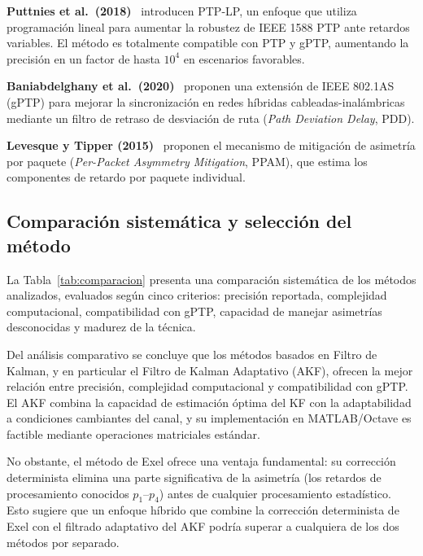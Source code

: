 \textbf{Puttnies et al.\ (2018)}~\cite{puttnies2018} introducen PTP-LP, un enfoque que utiliza programación lineal para aumentar la robustez de IEEE 1588 PTP ante retardos variables. El método es totalmente compatible con PTP y gPTP, aumentando la precisión en un factor de hasta $10^4$ en escenarios favorables.

\textbf{Baniabdelghany et al.\ (2020)}~\cite{baniabdelghany2020} proponen una extensión de IEEE 802.1AS (gPTP) para mejorar la sincronización en redes híbridas cableadas-inalámbricas mediante un filtro de retraso de desviación de ruta (\textit{Path Deviation Delay}, PDD).

\textbf{Levesque y Tipper (2015)}~\cite{levesque2015} proponen el mecanismo de mitigación de asimetría por paquete (\textit{Per-Packet Asymmetry Mitigation}, PPAM), que estima los componentes de retardo por paquete individual.

\subsection{Comparación sistemática y selección del método}
\label{sec:2.2.7}

La Tabla~\ref{tab:comparacion} presenta una comparación sistemática de los métodos analizados, evaluados según cinco criterios: precisión reportada, complejidad computacional, compatibilidad con gPTP, capacidad de manejar asimetrías desconocidas y madurez de la técnica.



Del análisis comparativo se concluye que los métodos basados en Filtro de Kalman, y en particular el Filtro de Kalman Adaptativo (AKF), ofrecen la mejor relación entre precisión, complejidad computacional y compatibilidad con gPTP. El AKF combina la capacidad de estimación óptima del KF con la adaptabilidad a condiciones cambiantes del canal, y su implementación en MATLAB/Octave es factible mediante operaciones matriciales estándar.

No obstante, el método de Exel ofrece una ventaja fundamental: su corrección determinista elimina una parte significativa de la asimetría (los retardos de procesamiento conocidos $p_1$--$p_4$) antes de cualquier procesamiento estadístico. Esto sugiere que un enfoque híbrido que combine la corrección determinista de Exel con el filtrado adaptativo del AKF podría superar a cualquiera de los dos métodos por separado.

